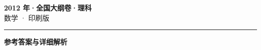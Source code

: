 \documentclass[zihao=5, a4paper]{ctexart}
\begin{document}
\begin{center}
  {\Large\bfseries 2012 年·全国大纲卷·理科}\\[4pt]
  {\large 数学 · 印刷版}
\end{center}
\medskip
{}

\par\bigskip\hrule\bigskip
{}
\begin{center}{\large\bfseries 参考答案与详细解析}\end{center}
\smallskip

\end{document}
